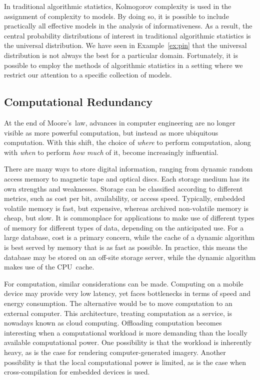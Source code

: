 In traditional algorithmic statistics, Kolmogorov complexity is used in the assignment of complexity to models.
By doing so, it is possible to include practically all effective models in the analysis of informativeness.
As a result, the central probability distributions of interest in traditional algorithmic statistics is the universal distribution.
We have seen in Example~\ref{ex:pin} that the universal distribution is not always the best for a particular domain.
Fortunately, it is possible to employ the methods of algorithmic statistics in a setting where we restrict our attention to a specific collection of models.

\subsection{Computational Redundancy}
At the end of Moore's~law, advances in computer engineering are no longer visible as more powerful computation, but instead as more ubiquitous computation.
With this shift, the choice of \emph{where} to perform computation, along with \emph{when} to perform \emph{how much} of it, become increasingly influential.

\begin{example}
  There are many ways to store digital information, ranging from dynamic random access memory to magnetic tape and optical discs.
  Each storage medium has its own strengths and weaknesses.
  Storage can be classified according to different metrics, such as cost per bit, availability, or access speed.
  Typically, embedded volatile memory is fast, but expensive, whereas archived non-volatile memory is cheap, but slow.
  It is commonplace for applications to make use of different types of memory for different types of data, depending on the anticipated use.
  For a large database, cost is a primary concern, while the cache of a dynamic algorithm is best served by memory that is as fast as possible.
  In practice, this means the database may be stored on an off-site storage server, while the dynamic algorithm makes use of the CPU~cache.

  For computation, similar considerations can be made.
  Computing on a mobile device may provide very low latency, yet faces bottlenecks in terms of speed and energy consumption.
  The alternative would be to move computation to an external computer.
  This architecture, treating computation as a service, is nowadays known as cloud computing.
  Offloading computation becomes interesting when a computational workload is more demanding than the locally available computational power.
  One possibility is that the workload is inherently heavy, as is the case for rendering computer-generated imagery.
  Another possibility is that the local computational power is limited, as is the case when cross-compilation for embedded devices is used.
\end{example}

